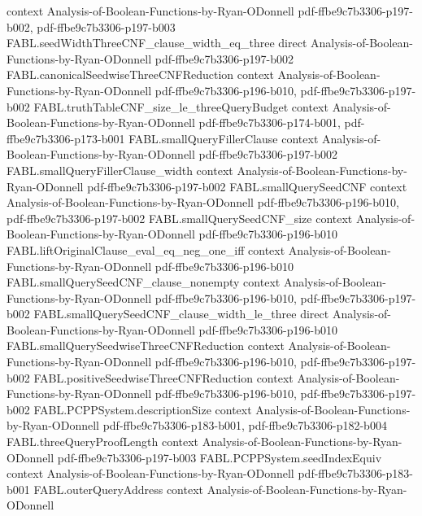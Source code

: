 \begin{theorem}
  {context}
  {Analysis-of-Boolean-Functions-by-Ryan-ODonnell}
  {pdf-ffbe9c7b3306-p197-b002,
    pdf-ffbe9c7b3306-p197-b003}
\proofstep
  {FABL.seedWidthThreeCNF_clause_width_eq_three}
  {direct}
  {Analysis-of-Boolean-Functions-by-Ryan-ODonnell}
  {pdf-ffbe9c7b3306-p197-b002}
\proofstep
  {FABL.canonicalSeedwiseThreeCNFReduction}
  {context}
  {Analysis-of-Boolean-Functions-by-Ryan-ODonnell}
  {pdf-ffbe9c7b3306-p196-b010,
    pdf-ffbe9c7b3306-p197-b002}
\proofstep
  {FABL.truthTableCNF_size_le_threeQueryBudget}
  {context}
  {Analysis-of-Boolean-Functions-by-Ryan-ODonnell}
  {pdf-ffbe9c7b3306-p174-b001,
    pdf-ffbe9c7b3306-p173-b001}
\proofstep
  {FABL.smallQueryFillerClause}
  {context}
  {Analysis-of-Boolean-Functions-by-Ryan-ODonnell}
  {pdf-ffbe9c7b3306-p197-b002}
\proofstep
  {FABL.smallQueryFillerClause_width}
  {context}
  {Analysis-of-Boolean-Functions-by-Ryan-ODonnell}
  {pdf-ffbe9c7b3306-p197-b002}
\proofstep
  {FABL.smallQuerySeedCNF}
  {context}
  {Analysis-of-Boolean-Functions-by-Ryan-ODonnell}
  {pdf-ffbe9c7b3306-p196-b010,
    pdf-ffbe9c7b3306-p197-b002}
\proofstep
  {FABL.smallQuerySeedCNF_size}
  {context}
  {Analysis-of-Boolean-Functions-by-Ryan-ODonnell}
  {pdf-ffbe9c7b3306-p196-b010}
\proofstep
  {FABL.liftOriginalClause_eval_eq_neg_one_iff}
  {context}
  {Analysis-of-Boolean-Functions-by-Ryan-ODonnell}
  {pdf-ffbe9c7b3306-p196-b010}
\proofstep
  {FABL.smallQuerySeedCNF_clause_nonempty}
  {context}
  {Analysis-of-Boolean-Functions-by-Ryan-ODonnell}
  {pdf-ffbe9c7b3306-p196-b010,
    pdf-ffbe9c7b3306-p197-b002}
\proofstep
  {FABL.smallQuerySeedCNF_clause_width_le_three}
  {direct}
  {Analysis-of-Boolean-Functions-by-Ryan-ODonnell}
  {pdf-ffbe9c7b3306-p196-b010}
\proofstep
  {FABL.smallQuerySeedwiseThreeCNFReduction}
  {context}
  {Analysis-of-Boolean-Functions-by-Ryan-ODonnell}
  {pdf-ffbe9c7b3306-p196-b010,
    pdf-ffbe9c7b3306-p197-b002}
\proofstep
  {FABL.positiveSeedwiseThreeCNFReduction}
  {context}
  {Analysis-of-Boolean-Functions-by-Ryan-ODonnell}
  {pdf-ffbe9c7b3306-p196-b010,
    pdf-ffbe9c7b3306-p197-b002}
\proofstep
  {FABL.PCPPSystem.descriptionSize}
  {context}
  {Analysis-of-Boolean-Functions-by-Ryan-ODonnell}
  {pdf-ffbe9c7b3306-p183-b001,
    pdf-ffbe9c7b3306-p182-b004}
\proofstep
  {FABL.threeQueryProofLength}
  {context}
  {Analysis-of-Boolean-Functions-by-Ryan-ODonnell}
  {pdf-ffbe9c7b3306-p197-b003}
\proofstep
  {FABL.PCPPSystem.seedIndexEquiv}
  {context}
  {Analysis-of-Boolean-Functions-by-Ryan-ODonnell}
  {pdf-ffbe9c7b3306-p183-b001}
\proofstep
  {FABL.outerQueryAddress}
  {context}
  {Analysis-of-Boolean-Functions-by-Ryan-ODonnell}

\end{theorem}
